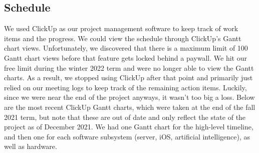 \documentclass[a4paper,11pt]{article}
\begin{document}
\subsection{Schedule}
\label{schedule}
We used ClickUp \cite{clickup} as our project management software to keep track of work items and the progress. We could view the schedule through ClickUp's Gantt chart views. Unfortunately, we discovered that there is a maximum limit of 100 Gantt chart views before that feature gets locked behind a paywall. We hit our free limit during the winter 2022 term and were no longer able to view the Gantt charts. As a result, we stopped using ClickUp after that point and primarily just relied on our meeting logs to keep track of the remaining action items. Luckily, since we were near the end of the project anyways, it wasn't too big a loss. Below are the most recent ClickUp Gantt charts, which were taken at the end of the fall 2021 term, but note that these are out of date and only reflect the state of the project as of December 2021. We had one Gantt chart for the high-level timeline, and then one for each software subsystem (server, iOS, artificial intelligence), as well as hardware.
\end{document}
